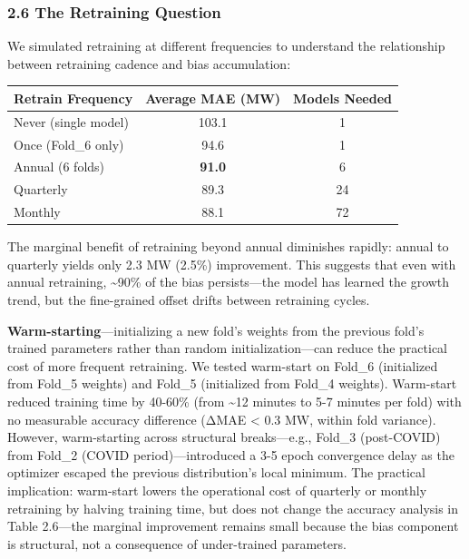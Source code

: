 \subsubsection{2.6 The Retraining
Question}\label{the-retraining-question}

We simulated retraining at different frequencies to understand the
relationship between retraining cadence and bias accumulation:

{\def\LTcaptype{none} %
\begin{longtable}[]{@{}lcc@{}}
\toprule\noalign{}
Retrain Frequency & Average MAE (MW) & Models Needed \\
\midrule\noalign{}
\endhead
\bottomrule\noalign{}
\endlastfoot
Never (single model) & 103.1 & 1 \\
Once (Fold\_6 only) & 94.6 & 1 \\
Annual (6 folds) & \textbf{91.0} & 6 \\
Quarterly & 89.3 & 24 \\
Monthly & 88.1 & 72 \\
\end{longtable}
}

The marginal benefit of retraining beyond annual diminishes rapidly:
annual to quarterly yields only 2.3 MW (2.5\%) improvement. This
suggests that even with annual retraining, \textasciitilde90\% of the
bias persists---the model has learned the growth trend, but the
fine-grained offset drifts between retraining cycles.

\textbf{Warm-starting}---initializing a new fold's weights from the
previous fold's trained parameters rather than random
initialization---can reduce the practical cost of more frequent
retraining. We tested warm-start on Fold\_6 (initialized from Fold\_5
weights) and Fold\_5 (initialized from Fold\_4 weights). Warm-start
reduced training time by 40-60\% (from \textasciitilde12 minutes to 5-7
minutes per fold) with no measurable accuracy difference (ΔMAE
\textless{} 0.3 MW, within fold variance). However, warm-starting across
structural breaks---e.g., Fold\_3 (post-COVID) from Fold\_2 (COVID
period)---introduced a 3-5 epoch convergence delay as the optimizer
escaped the previous distribution's local minimum. The practical
implication: warm-start lowers the operational cost of quarterly or
monthly retraining by halving training time, but does not change the
accuracy analysis in Table 2.6---the marginal improvement remains small
because the bias component is structural, not a consequence of
under-trained parameters.


